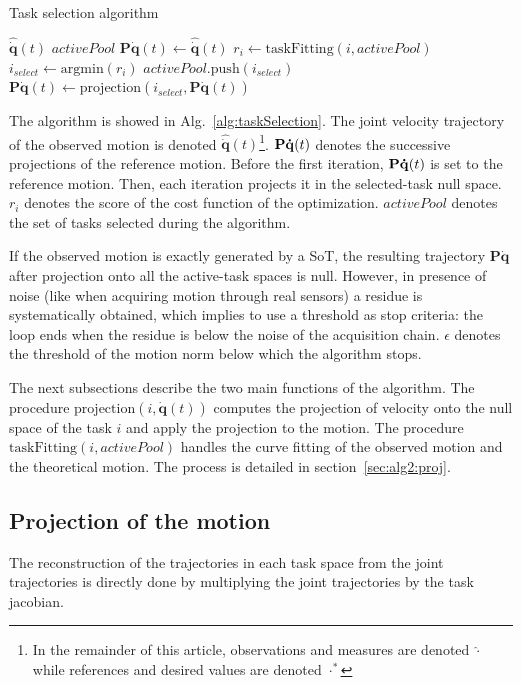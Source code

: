 \documentclass[journal]{IEEEtran}
\begin{document}
\begin{algorithm}[t]
  \caption{Task selection algorithm}
  \label{alg:taskSelection}
\begin{algorithmic}[1]
  \STATE \shINPUT $\mathbf{\hat{\dot{q}}}(t)$
\STATE \shOUTPUT $activePool$
\STATE $\mathbf{P}\mathbf{\dot{q}}(t)\gets \mathbf{\hat{\dot{q}}}(t)$
    \STATE $r_i \gets \mathrm{taskFitting}(i, activePool)$
  \ENDFOR
  \STATE $i_{select} \gets \mathrm{argmin}(r_i)$
  \STATE $activePool.\mathrm{push}(i_{select})$
  \STATE $\mathbf{P}\mathbf{\dot{q}}(t) \gets \mathrm{projection}(i_{select}, \mathbf{P}\mathbf{\dot{q}}(t))$
\ENDWHILE
\end{algorithmic}
\end{algorithm}
The algorithm is showed in Alg.~\ref{alg:taskSelection}.
The joint velocity trajectory
of the observed motion is denoted $\mathbf{\hat{\dot{q}}}(t)$\footnote{In the remainder of this article, observations
and measures are denoted $\hat{\cdot}$ while references and desired values are denoted $\cdot^*$}.
${\mathbf{P\dot{q}}}(t)$ denotes the successive projections of the reference
motion. Before the first iteration, ${\mathbf{P\dot{q}}}(t)$ is set to the reference motion.
Then, each iteration projects it in the selected-task null space.
$r_i$ denotes the score of the cost function of the optimization. $activePool$ denotes
the set of tasks selected during the algorithm. 

If the observed motion is exactly generated by a SoT, 
the resulting trajectory $\mathbf{P\dot{q}}$ after projection
onto all the active-task spaces is null. However, in presence of noise (like when
acquiring motion through real sensors)
a residue is systematically obtained, which implies to use a threshold
as stop criteria: the loop ends when the residue is below the noise of
the acquisition chain. $\epsilon$ denotes the threshold
of the motion norm below which the algorithm stops.

The next subsections describe the two main functions of the algorithm.
The procedure $\mathrm{projection}(i, \mathbf{\dot{q}}(t))$ computes the projection of
velocity onto the null space of the task $i$ and apply the projection to the motion.
The procedure $\mathrm{taskFitting}(i, activePool)$ handles the curve fitting
of the observed motion and the theoretical motion. The process is detailed in section~\ref{sec:alg2:proj}.


\subsection{Projection of the motion}
The reconstruction of the trajectories in each task space from the joint trajectories is directly
done by multiplying the joint trajectories by the task jacobian.
\end{document}
